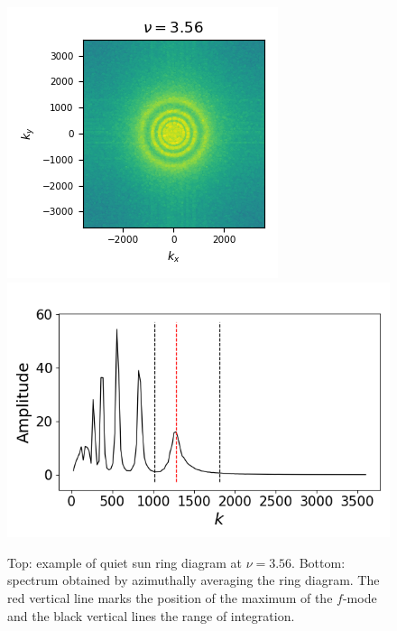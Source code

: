 \documentclass{aa}
\begin{document}
\begin{figure}\centering
	\includegraphics[width=1.0\linewidth,trim={0cm 0.4cm 0cm 0.3cm},clip=TRUE]{ring_diagram}\\
	\includegraphics[width=1.0\linewidth,trim={0cm 0cm 0cm 1cm},clip=TRUE]{az_avg_spec}
	\caption{Top: example of quiet sun ring diagram at $\nu=3.56$. Bottom: spectrum obtained by azimuthally averaging the ring diagram. The red vertical line marks the position of the maximum of the $f$-mode and the black vertical lines the range of integration.}
	\label{ring_diagram}
\end{figure}
\end{document}
